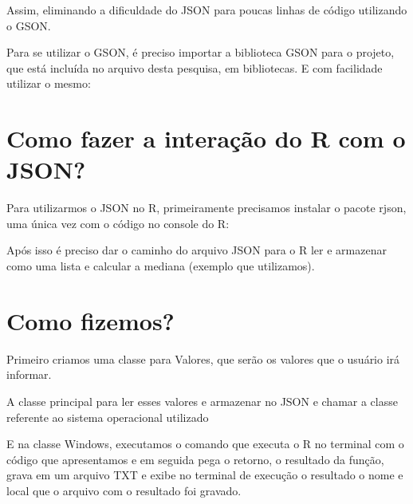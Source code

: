 \documentclass[12pt,a4paper]{article}
\begin{document}
Assim, eliminando a dificuldade do JSON para poucas linhas de código utilizando o GSON.

Para se utilizar o GSON, é preciso importar a biblioteca GSON para o projeto, que está incluída no arquivo desta pesquisa, em bibliotecas. E com facilidade utilizar o mesmo:




\section{Como fazer a interação do R com o JSON?}
Para utilizarmos o JSON no R, primeiramente precisamos instalar o pacote rjson, uma única vez com o código no console do R: 


Após isso é preciso dar o caminho do arquivo JSON para o R ler e armazenar como uma lista e calcular a mediana (exemplo que utilizamos).




\section{Como fizemos?}
Primeiro criamos uma classe para Valores, que serão os valores que o usuário irá informar.


A classe principal para ler esses valores e armazenar no JSON e chamar a classe referente ao sistema operacional utilizado



E na classe Windows, executamos o comando que executa o R no terminal com o código que apresentamos e em seguida pega o retorno, o resultado da função, grava em um arquivo TXT e exibe no terminal de execução o resultado o nome e local que o arquivo com o resultado foi gravado.


\end{document}

